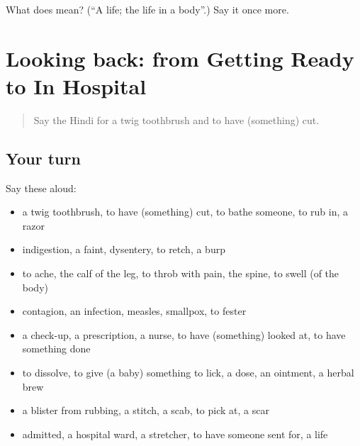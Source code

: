\begin{tcolorbox}[breakable,colback=teal!4,colframe=teal!35!black,title={Before you move on}]
What does  mean? (\textquotedblleft{}A life; the life in a body\textquotedblright{}.) Say it once more.
\end{tcolorbox}
\section[(dialogue)]{Looking back: from Getting Ready to In Hospital}

\label{lesson:HI-R491-review-484-491}



\begin{quote}
Say the Hindi for a twig toothbrush and to have (something) cut.
\end{quote}

\subsection*{Your turn}
Say these aloud:

\begin{itemize}
\raggedright
  \item a twig toothbrush, to have (something) cut, to bathe someone, to rub in, a razor
  \item indigestion, a faint, dysentery, to retch, a burp
  \item to ache, the calf of the leg, to throb with pain, the spine, to swell (of the body)
  \item contagion, an infection, measles, smallpox, to fester
  \item a check-up, a prescription, a nurse, to have (something) looked at, to have something done
  \item to dissolve, to give (a baby) something to lick, a dose, an ointment, a herbal brew
  \item a blister from rubbing, a stitch, a scab, to pick at, a scar
  \item admitted, a hospital ward, a stretcher, to have someone sent for, a life
\end{itemize}

